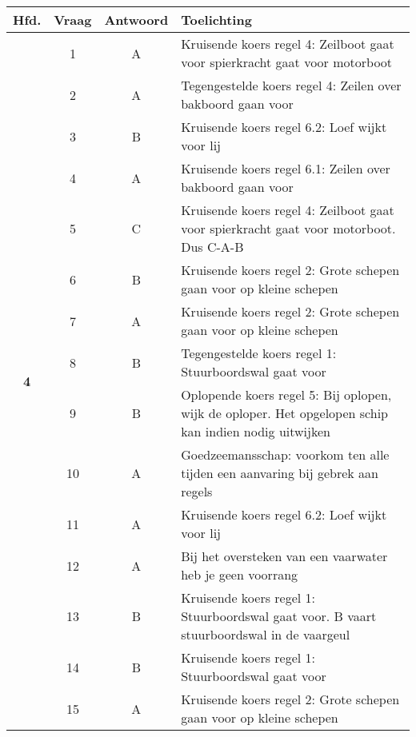 \begin{table}[h]
	\centering
	\begin{tabular}{c|c|c|m{9.5cm}}
		\textbf{Hfd.}       & \textbf{Vraag} & \textbf{Antwoord} & \textbf{Toelichting} \\ \hline 
		\multirow{16}{*}{\sffamily\bfseries{\textcolor{ocre}{\LARGE4}} } & 1 & A & Kruisende koers regel 4: Zeilboot gaat voor spierkracht gaat voor motorboot\\ \cline{2-4} 
		& 2 & A & Tegengestelde koers regel 4: Zeilen over bakboord gaan voor \\ \cline{2-4} 
		& 3 & B & Kruisende koers regel 6.2: Loef wijkt voor lij \\ \cline{2-4} 
		& 4 & A & Kruisende koers regel 6.1: Zeilen over bakboord gaan voor \\ \cline{2-4} 
		& 5 & C & Kruisende koers regel 4: Zeilboot gaat voor spierkracht gaat voor motorboot. Dus C-A-B \\ \cline{2-4} 
		& 6 & B & Kruisende koers regel 2: Grote schepen gaan voor op kleine schepen \\ \cline{2-4} 
		& 7 & A &Kruisende koers regel 2: Grote schepen gaan voor op kleine schepen \\ \cline{2-4} 
		& 8 & B & Tegengestelde koers regel 1: Stuurboordswal gaat voor \\ \cline{2-4} 
		& 9 & B & Oplopende koers regel 5: Bij oplopen, wijk de oploper. Het opgelopen schip kan indien nodig uitwijken\\ \cline{2-4} 
		& 10 & A & Goedzeemansschap: voorkom ten alle tijden een aanvaring bij gebrek aan regels \\ \cline{2-4} 
		& 11 & A & Kruisende koers regel 6.2: Loef wijkt voor lij \\ \cline{2-4} 
		& 12 & A & Bij het oversteken van een vaarwater heb je geen voorrang \\ \cline{2-4} 
		& 13 & B & Kruisende koers regel 1: Stuurboordswal gaat voor. B vaart stuurboordswal in de vaargeul\\ \cline{2-4} 
		& 14 & B & Kruisende koers regel 1: Stuurboordswal gaat voor \\ \cline{2-4} 
		& 15 & A & Kruisende koers regel 2: Grote schepen gaan voor op kleine schepen \\ 
	\end{tabular}
\end{table}



